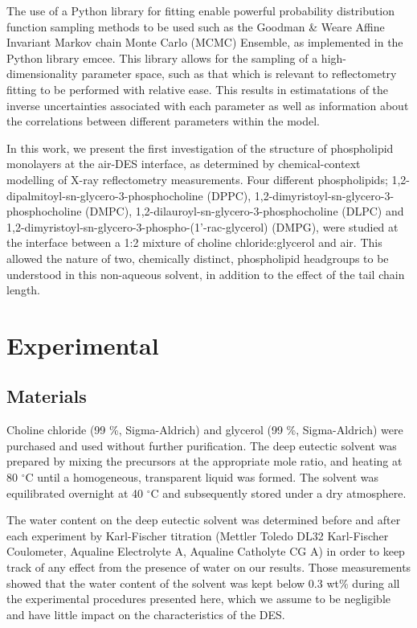 \documentclass[twoside,twocolumn,9pt]{article}
\begin{document}
The use of a Python library for fitting enable powerful probability distribution function sampling methods to be used such as the Goodman \& Weare Affine Invariant Markov chain Monte Carlo (MCMC) Ensemble,\cite{Goodman2010} as implemented in the Python library emcee.\cite{Foreman-Mackey2013} This library allows for the sampling of a high-dimensionality parameter space, such as that which is relevant to reflectometry fitting to be performed with relative ease. This results in estimatations of the inverse uncertainties associated with each parameter as well as information about the correlations between different parameters within the model. 

In this work, we present the first investigation of the structure of phospholipid monolayers at the air-DES interface, as determined by chemical-context modelling of X-ray reflectometry measurements. Four different phospholipids; 1,2-dipalmitoyl-sn-glycero-3-phosphocholine (DPPC), 1,2-dimyristoyl-sn-glycero-3-phosphocholine (DMPC),  1,2-dilauroyl-sn-glycero-3-phosphocholine (DLPC) and 1,2-dimyristoyl-sn-glycero-3-phospho-(1'-rac-glycerol) (DMPG), were studied at the interface between a 1:2 mixture of choline chloride:glycerol and air. This allowed the nature of two, chemically distinct, phospholipid headgroups to be understood in this non-aqueous solvent, in addition to the effect of the tail chain length. 

\section{Experimental}

\subsection{Materials}
Choline chloride (99 \%, Sigma-Aldrich) and glycerol (99 \%, Sigma-Aldrich) were purchased and used without further purification. The deep eutectic solvent was prepared by mixing the precursors at the appropriate mole ratio, and heating at 80 $^\circ$C until a homogeneous, transparent liquid was formed.\cite{Smith2014} The solvent was equilibrated overnight at 40 $^\circ$C and subsequently stored under a dry atmosphere. 

The water content on the deep eutectic solvent was determined before and after each experiment by Karl-Fischer titration (Mettler Toledo DL32 Karl-Fischer Coulometer, Aqualine Electrolyte A, Aqualine Catholyte CG A) in order to keep track of any effect from the presence of water on our results. Those measurements showed that the water content of the solvent was kept below 0.3 wt\% during all the experimental procedures presented here, which we assume to be negligible and have little impact on the characteristics of the DES.\cite{Hammond2016,Hammond2017}
\end{document}
